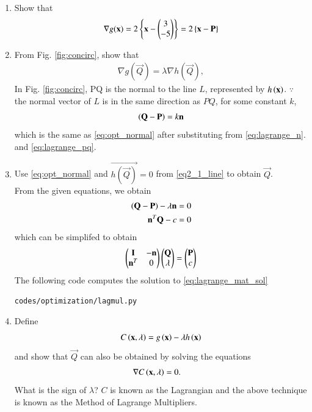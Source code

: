 \begin{enumerate}[label=\arabic*.,ref=\thesection.\theenumi]
\item Show that 
\begin{align}
\nabla g(\mathbf{x}) = 2\left\{\mathbf{x}-\begin{pmatrix}3 \\ -5\end{pmatrix}\right\} = 2\left\{\mathbf{x}-\mathbf{P}\right\}
\label{eq:lagrange_pq}
\end{align}
%
\item From Fig. \ref{fig:concirc}, show that 
\begin{align}
\label{eq:opt_normal}
\nabla g(\vec{Q}) = \lambda \nabla h(\vec{Q}),
\end{align}
%
\solution In Fig. \ref{fig:concirc}, PQ is the normal to the line $L$, represented by $h\left(\mathbf{x}\right)$. 
$\because$ the normal vector of $L$ is in the same direction as $PQ$,  for some constant $k$, 
%
\begin{align}
\left(\mathbf{Q}-\mathbf{P}\right) = k \mathbf{n}
\end{align}
%
which is the same as \eqref{eq:opt_normal} after substituting from \eqref{eq:lagrange_n}.
 and \eqref{eq:lagrange_pq}.
\item Use \eqref{eq:opt_normal} and $\vec{h(\vec{Q})}=0$ from \eqref{eq2_1_line} to obtain $\vec{Q}$.
\\
\solution From the given equations, we obtain
\begin{align}
\left(\mathbf{Q}-\mathbf{P}\right)-\lambda \mathbf{n} &= 0 
\\
\mathbf{n}^T\mathbf{Q} - c &= 0
\label{eq:lagrange_mat_eq}
\end{align}
%
which can be simplifed to obtain
%
\begin{align}
\begin{pmatrix}\mathbf{I} & -\mathbf{n} \\ \mathbf{n}^T & 0\end{pmatrix}\begin{pmatrix}\mathbf{Q}\\ \lambda\end{pmatrix} = \begin{pmatrix}\mathbf{P}\\c\end{pmatrix}
\label{eq:lagrange_mat_sol}
\end{align}
The following code computes the solution to \eqref{eq:lagrange_mat_sol}
%
\begin{lstlisting}
codes/optimization/lagmul.py
\end{lstlisting}

\item
\label{lagrange}
	Define 
	\begin{equation}
	\label{lagrangian}
	C\brak{\mbf{x},\lambda} = g\brak{\mbf{x}} - \lambda h\brak{\mbf{x}}%
	\end{equation}
and show that $\vec{Q}$ can also be obtained by 
solving the equations
%
\begin{align}
\nabla C\left(\mathbf{x},\lambda\right) &= 0.
\label{tangent}
\end{align}
%
What is the sign of $\lambda$?  $C$ is known as the Lagrangian and the above technique is known as the Method of Lagrange Multipliers.


\end{enumerate}
